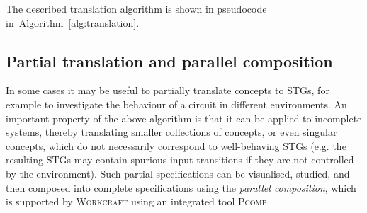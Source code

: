 \documentclass[british, journal]{IEEEtran}
\newcommand{\noun}[1]{\textsc{#1}}
\begin{document}
The described translation algorithm is shown in pseudocode
in~Algorithm~\ref{alg:translation}.

\vspace{-1mm}
\subsection{Partial translation and parallel composition}

In some cases it may be useful to partially translate concepts to STGs, for
example to investigate the behaviour of a circuit
in different environments. An important property of the above algorithm is
that it can be applied to incomplete systems, thereby translating
smaller collections of concepts, or even singular concepts, which do not
necessarily correspond to well-behaving STGs (e.g. the resulting STGs may
contain
spurious input transitions if they are not controlled by the environment).
Such partial specifications can be visualised, studied, and then composed into
complete specifications using the \emph{parallel composition}, which is
supported
by \noun{Workcraft} using an integrated tool \noun{Pcomp}~\cite{PCOMP}.
\end{document}
